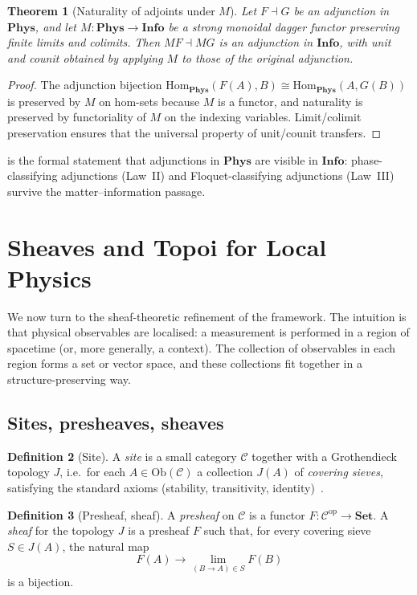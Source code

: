 \documentclass[12pt]{article}
\newtheorem{theorem}{Theorem}[section]
\theoremstyle{definition}
\newtheorem{definition}[theorem]{Definition}
\theoremstyle{remark}
\newcommand{\C}{\mathcal{C}}
\newcommand{\Phys}{\mathbf{Phys}}
\newcommand{\Info}{\mathbf{Info}}
\newcommand{\Set}{\mathbf{Set}}
\newcommand{\op}{\mathrm{op}}
\newcommand{\Hom}{\mathrm{Hom}}
\newcommand{\Ob}{\mathrm{Ob}}
\begin{document}
\begin{theorem}[Naturality of adjoints under $M$]
\label{thm:adjoint-naturality}
Let $F \dashv G$ be an adjunction in $\Phys$, and let $M : \Phys \to \Info$ be a strong monoidal dagger functor preserving finite limits and colimits. Then $M F \dashv M G$ is an adjunction in $\Info$, with unit and counit obtained by applying $M$ to those of the original adjunction.
\end{theorem}

\begin{proof}
The adjunction bijection $\Hom_\Phys(F(A), B) \cong \Hom_\Phys(A, G(B))$ is preserved by $M$ on hom-sets because $M$ is a functor, and naturality is preserved by functoriality of $M$ on the indexing variables. Limit/colimit preservation ensures that the universal property of unit/counit transfers.
\end{proof}

 is the formal statement that adjunctions in $\Phys$ are visible in $\Info$: phase-classifying adjunctions (Law~II) and Floquet-classifying adjunctions (Law~III) survive the matter--information passage.

\section{Sheaves and Topoi for Local Physics}
\label{sec:sheaves}

We now turn to the sheaf-theoretic refinement of the framework. The intuition is that physical observables are localised: a measurement is performed in a region of spacetime (or, more generally, a context). The collection of observables in each region forms a set or vector space, and these collections fit together in a structure-preserving way.

\subsection{Sites, presheaves, sheaves}

\begin{definition}[Site]
A \emph{site} is a small category $\C$ together with a Grothendieck topology $J$, i.e.\ for each $A \in \Ob(\C)$ a collection $J(A)$ of \emph{covering sieves}, satisfying the standard axioms (stability, transitivity, identity)~\cite{maclane1998}.
\end{definition}

\begin{definition}[Presheaf, sheaf]
A \emph{presheaf} on $\C$ is a functor $F : \C^\op \to \Set$. A \emph{sheaf} for the topology $J$ is a presheaf $F$ such that, for every covering sieve $S \in J(A)$, the natural map
\[
F(A) \longrightarrow \lim_{(B \to A) \in S} F(B)
\]
is a bijection.
\end{definition}
\end{document}
